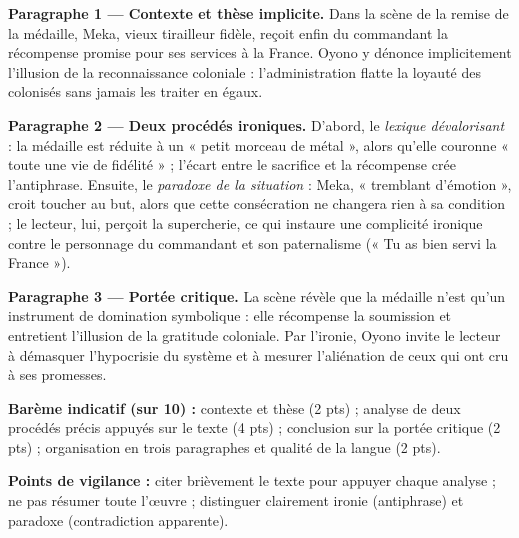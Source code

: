 \documentclass[11pt]{article}
\begin{document}
\begin{corrige}
\textbf{Paragraphe 1 — Contexte et thèse implicite.} Dans la scène de la remise de la médaille, Meka, vieux tirailleur fidèle, reçoit enfin du commandant la récompense promise pour ses services à la France. Oyono y dénonce implicitement l'illusion de la reconnaissance coloniale : l'administration flatte la loyauté des colonisés sans jamais les traiter en égaux.

\textbf{Paragraphe 2 — Deux procédés ironiques.} D'abord, le \emph{lexique dévalorisant} : la médaille est réduite à un « petit morceau de métal », alors qu'elle couronne « toute une vie de fidélité » ; l'écart entre le sacrifice et la récompense crée l'antiphrase. Ensuite, le \emph{paradoxe de la situation} : Meka, « tremblant d'émotion », croit toucher au but, alors que cette consécration ne changera rien à sa condition ; le lecteur, lui, perçoit la supercherie, ce qui instaure une complicité ironique contre le personnage du commandant et son paternalisme (« Tu as bien servi la France »).

\textbf{Paragraphe 3 — Portée critique.} La scène révèle que la médaille n'est qu'un instrument de domination symbolique : elle récompense la soumission et entretient l'illusion de la gratitude coloniale. Par l'ironie, Oyono invite le lecteur à démasquer l'hypocrisie du système et à mesurer l'aliénation de ceux qui ont cru à ses promesses.

\textbf{Barème indicatif (sur 10) :} contexte et thèse (2 pts) ; analyse de deux procédés précis appuyés sur le texte (4 pts) ; conclusion sur la portée critique (2 pts) ; organisation en trois paragraphes et qualité de la langue (2 pts).

\textbf{Points de vigilance :} citer brièvement le texte pour appuyer chaque analyse ; ne pas résumer toute l'œuvre ; distinguer clairement ironie (antiphrase) et paradoxe (contradiction apparente).
\end{corrige}
\end{document}
